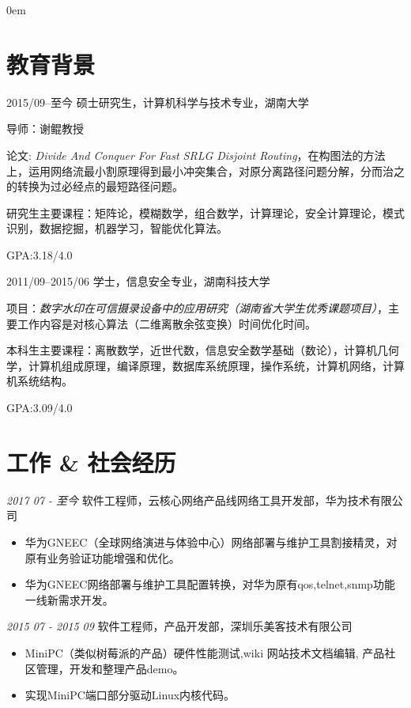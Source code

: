 \documentclass[letterpaper,11pt]{article}
\begin{document}
\parindent 0em
\thispagestyle{myheadings}


\makecvtitle


\section{教育背景}

\begin{CV}
\item[2015/09--至今] 硕士研究生，计算机科学与技术专业，湖南大学

导师：谢鲲教授

论文: \emph{Divide And Conquer For Fast SRLG Disjoint Routing}，在构图法的方法上，运用网络流最小割原理得到最小冲突集合，对原分离路径问题分解，分而治之的转换为过必经点的最短路径问题。

研究生主要课程：矩阵论，模糊数学，组合数学，计算理论，安全计算理论，模式识别，数据挖掘，机器学习，智能优化算法。

GPA:3.18/4.0
\item[2011/09--2015/06] 学士，信息安全专业，湖南科技大学

项目：\emph{数字水印在可信摄录设备中的应用研究（湖南省大学生优秀课题项目）}，主要工作内容是对核心算法（二维离散余弦变换）时间优化时间。

本科生主要课程：离散数学，近世代数，信息安全数学基础（数论），计算机几何学，计算机组成原理，编译原理，数据库系统原理，操作系统，计算机网络，计算机系统结构。

GPA:3.09/4.0
\end{CV}

\section{工作 \& 社会经历}

\begin{CV}
\item[\it 2017 07 - 至今]{软件工程师，}{云核心网络产品线网络工具开发部}{，华为技术有限公司}
	\begin{itemize}[\color{bl3}\aldineleft]
		\item{华为GNEEC（全球网络演进与体验中心）网络部署与维护工具割接精灵，对原有业务验证功能增强和优化。}
		\item{华为GNEEC网络部署与维护工具配置转换，对华为原有qos,telnet,snmp功能一线新需求开发。}
	\end{itemize}
\item[\it 2015 07 - 2015 09]
	  {软件工程师，}{产品开发部}{，深圳乐美客技术有限公司}
	\begin{itemize}[\color{bl3}\aldineleft]
		\item {MiniPC（类似树莓派的产品）硬件性能测试,wiki 网站技术文档编辑, 产品社区管理，开发和整理产品demo。}
		\item {实现MiniPC端口部分驱动Linux内核代码。}
	\end{itemize}


\end{CV}
\end{document}
